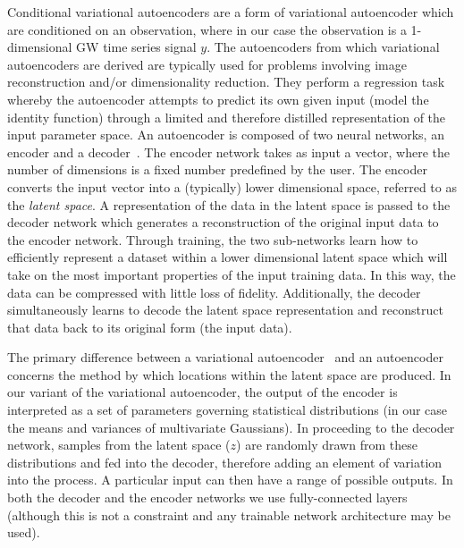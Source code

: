\documentclass[%
showpacs,
 amsmath,amssymb,
 aps,
 twocolumn,
 prl,
 reprint,
floatfix,
]{revtex4-1}
\begin{document}
%
%
Conditional variational autoencoders are a form of variational autoencoder
which are conditioned on an observation, where in our case the observation is a
1-dimensional \ac{GW} time series signal $y$. The autoencoders from which
variational autoencoders are derived are typically used for problems involving
image reconstruction and/or dimensionality reduction. They perform a regression
task whereby the autoencoder attempts to predict its own given input (model the
identity function) through a limited and therefore distilled representation of
the input parameter space. An autoencoder is composed of two neural networks,
an encoder and a decoder~\cite{LIOU20083150}. The encoder network takes as
input a vector, where the number of dimensions is a fixed number predefined by
the user. The encoder converts the input vector into a (typically) lower
dimensional space, referred to as the {\it{latent space}}. A representation of
the data in the latent space is passed to the decoder network which generates a
reconstruction of the original input data to the encoder network. Through
training, the two sub-networks learn how to efficiently represent a dataset
within a lower dimensional latent space which will take on the most important
properties of the input training data. In this way, the data can be compressed
with little loss of fidelity. Additionally, the decoder simultaneously learns
to decode the latent space representation and reconstruct that data back to its
original form (the input data).

%
%
The primary difference between a variational autoencoder~\cite{1812.04405} and
an autoencoder concerns the method by which locations within the latent space
are produced. In our variant of the variational autoencoder, the output of the
encoder is interpreted as a set of parameters governing statistical
distributions (in our case the means and variances of multivariate Gaussians).
In proceeding to the decoder network, samples from the latent space ($z$) are
randomly drawn from these distributions and fed into the decoder, therefore
adding an element of variation into the process. A particular input can then
have a range of possible outputs. In both the decoder and the encoder networks
we use fully-connected layers (although this is not a constraint and any
trainable network architecture may be used).

\end{document}
